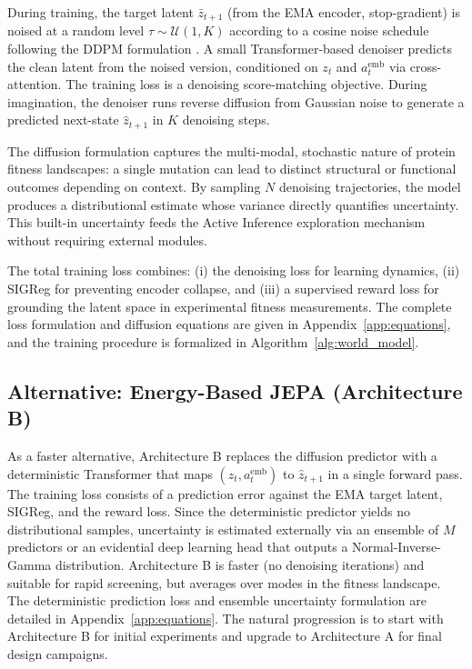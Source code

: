 \documentclass[12pt, a4paper]{article}
\begin{document}
During training, the target latent $\bar{z}_{t+1}$ (from the EMA encoder, stop-gradient) is noised at a random level $\tau \sim \mathcal{U}(1, K)$ according to a cosine noise schedule following the DDPM formulation \citep{ho2020ddpm}. A small Transformer-based denoiser predicts the clean latent from the noised version, conditioned on $z_t$ and $a_t^\text{emb}$ via cross-attention. The training loss is a denoising score-matching objective. During imagination, the denoiser runs reverse diffusion from Gaussian noise to generate a predicted next-state $\hat{z}_{t+1}$ in $K$ denoising steps.

The diffusion formulation captures the multi-modal, stochastic nature of protein fitness landscapes: a single mutation can lead to distinct structural or functional outcomes depending on context. By sampling $N$ denoising trajectories, the model produces a distributional estimate whose variance directly quantifies uncertainty. This built-in uncertainty feeds the Active Inference exploration mechanism without requiring external modules.

The total training loss combines: (i) the denoising loss for learning dynamics, (ii) SIGReg for preventing encoder collapse, and (iii) a supervised reward loss for grounding the latent space in experimental fitness measurements. The complete loss formulation and diffusion equations are given in Appendix~\ref{app:equations}, and the training procedure is formalized in Algorithm~\ref{alg:world_model}.

\subsection{Alternative: Energy-Based JEPA (Architecture B)}

As a faster alternative, Architecture B replaces the diffusion predictor with a deterministic Transformer that maps $(z_t, a_t^\text{emb})$ to $\hat{z}_{t+1}$ in a single forward pass. The training loss consists of a prediction error against the EMA target latent, SIGReg, and the reward loss. Since the deterministic predictor yields no distributional samples, uncertainty is estimated externally via an ensemble of $M$ predictors or an evidential deep learning head that outputs a Normal-Inverse-Gamma distribution. Architecture B is faster (no denoising iterations) and suitable for rapid screening, but averages over modes in the fitness landscape. The deterministic prediction loss and ensemble uncertainty formulation are detailed in Appendix~\ref{app:equations}. The natural progression is to start with Architecture B for initial experiments and upgrade to Architecture A for final design campaigns.
\end{document}
